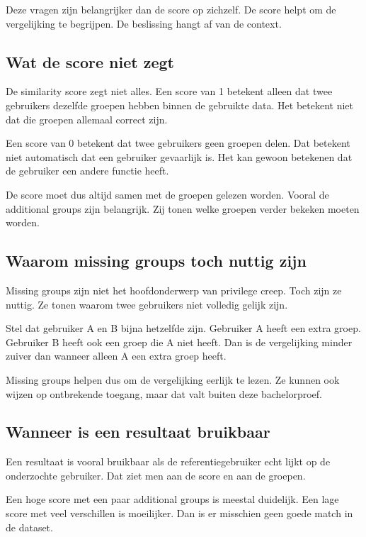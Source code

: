 Deze vragen zijn belangrijker dan de score op zichzelf. De score helpt om de vergelijking te begrijpen. De beslissing hangt af van de context.

\subsection*{Wat de score niet zegt}

De similarity score zegt niet alles. Een score van 1 betekent alleen dat twee gebruikers dezelfde groepen hebben binnen de gebruikte data. Het betekent niet dat die groepen allemaal correct zijn.

Een score van 0 betekent dat twee gebruikers geen groepen delen. Dat betekent niet automatisch dat een gebruiker gevaarlijk is. Het kan gewoon betekenen dat de gebruiker een andere functie heeft.

De score moet dus altijd samen met de groepen gelezen worden. Vooral de additional groups zijn belangrijk. Zij tonen welke groepen verder bekeken moeten worden.

\subsection*{Waarom missing groups toch nuttig zijn}

Missing groups zijn niet het hoofdonderwerp van privilege creep. Toch zijn ze nuttig. Ze tonen waarom twee gebruikers niet volledig gelijk zijn.

Stel dat gebruiker A en B bijna hetzelfde zijn. Gebruiker A heeft een extra groep. Gebruiker B heeft ook een groep die A niet heeft. Dan is de vergelijking minder zuiver dan wanneer alleen A een extra groep heeft.

Missing groups helpen dus om de vergelijking eerlijk te lezen. Ze kunnen ook wijzen op ontbrekende toegang, maar dat valt buiten deze bachelorproef.

\subsection*{Wanneer is een resultaat bruikbaar}

Een resultaat is vooral bruikbaar als de referentiegebruiker echt lijkt op de onderzochte gebruiker. Dat ziet men aan de score en aan de groepen.

Een hoge score met een paar additional groups is meestal duidelijk. Een lage score met veel verschillen is moeilijker. Dan is er misschien geen goede match in de dataset.

